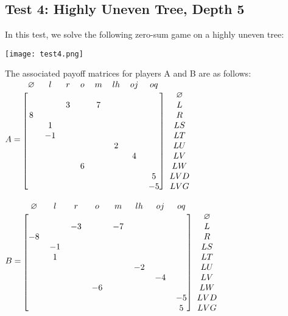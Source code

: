 \documentclass[11pt]{tufte-handout}
\theoremstyle{plain}
\theoremstyle{definition}
\theoremstyle{remark}
\begin{document}
\subsection{Test 4: Highly Uneven Tree, Depth 5}
In this test, we solve the following zero-sum game on a highly uneven tree:
\\[6pt]
\begin{center}
    \texttt{[image: test4.png]}
\end{center}
The associated payoff matrices for players A and B are as follows:\\[6pt]
$
        A = \begin{blockarray}{c c c c c c c c c}
            \varnothing & l & r & o & m & lh & oj & oq\\
            \begin{block}{[c c c c c c c c] c}
               & & & & & & &  &\varnothing \\
               & &3& &7& & &  &L \\
             8 & & & & & & &  &R \\
               &1& & & && &  &LS \\
               &-1& && & & &  &LT \\
               & & & & & 2& &  &LU \\
               & & & & &  &4&  &LV \\
               && &6& & & &  &LW \\  
               & & & & & & & 5&LVD \\
               & & & & & & & -5&LVG \\
            \end{block}
            \end{blockarray}$
\\
$B = \begin{blockarray}{c c c c c c c c c}
            \varnothing & l & r & o & m & lh & oj & oq\\
            \begin{block}{[c c c c c c c c] c}
               & & & & & & &  &\varnothing \\
               & &-3& &-7& & &  &L \\
             -8 & & & & & & &  &R \\
               &-1& & & && &  &LS \\
               &1& && & & &  &LT \\
               & & & & & -2& &  &LU \\
               & & & & &  &-4&  &LV \\
               && &-6& & & &  &LW \\  
               & & & & & & & -5&LVD \\
               & & & & & & & 5&LVG \\
            \end{block}
            \end{blockarray}$
\end{document}
